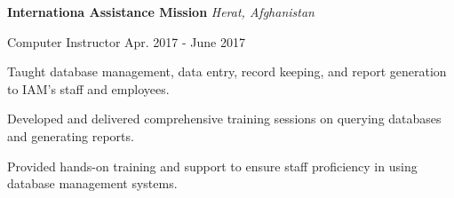 \begin{cventries}
\begin{rSection}{}{\bodyfont\bfseries\color{black} \hspace{-1.6em} {Internationa Assistance Mission}} \hfill{\bodyfont\slshape\color{awesome} {Herat, Afghanistan} \vspace{0.3em}}
\end{rSection}

  \cventry
    {Computer Instructor \vspace{0.1em}} %
    {} %
    {} %
    {\vspace{-0.1em}Apr. 2017 - June 2017} %
    {
      \begin{cvitems} %
        \item[] {Taught database management, data entry, record keeping, and report generation to IAM's staff and employees.}
        \item[] {Developed and delivered comprehensive training sessions on querying databases and generating reports.}
        \item[] {Provided hands-on training and support to ensure staff proficiency in using database management systems.}
      \end{cvitems}
    }
\end{cventries}
